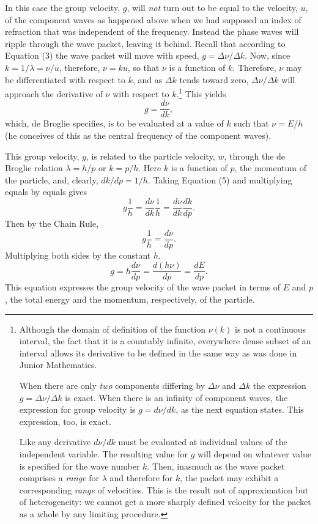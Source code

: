 In this case the group velocity, $g$, will \emph{not} turn out to
be equal to the velocity, $u$, of the component waves as happened
above when we had supposed an index of refraction that was independent
of the frequency. Instead the phase waves will ripple through the wave
packet, leaving it behind. Recall that according to Equation (3) the wave
packet will move with speed, $g = \Delta\nu/\Delta k$. Now, since
$k = 1/\lambda = \nu/u$, therefore,
$\nu = ku$, so that $\nu$ is a function of $k$.
Therefore, $\nu$ may be differentiated with respect to $k$, and
as $\Delta k$ tends toward zero, $\Delta\nu/\Delta k$ will approach the
derivative of $\nu$ with respect to $k$.\footnote{\label{fn:deb_range} Although the
  domain of definition of the function $\nu(k)$ is not a
  continuous interval, the fact that it is a countably infinite,
  everywhere dense subset of an interval allows its derivative to be
  defined in the same way as was done in Junior Mathematics.

  When there are only \emph{two} components differing by $\Delta\nu$ and
  $\Delta k$ the expression $g = \Delta\nu/\Delta k$ is exact. When
  there is an infinity of component waves, the expression for group
  velocity is $g = d\nu/dk$, as the next equation states. This
  expression, too, is exact.

  Like any derivative $d\nu/dk$ must be evaluated at individual
  values of the independent variable. The resulting value for $g$
  will depend on whatever value is specified for the wave number
  $k$. Then, inasmuch as the wave packet comprises a \emph{range}
  for $\lambda$ and therefore for $k$, the packet may exhibit a
  corresponding \emph{range} of velocities. This is the result not of
  approximation but of heterogeneity: we cannot get a more sharply
  defined velocity for the packet as a whole by any limiting procedure.}
This yields
\begin{equation*}\tag{5}\label{debsch}
g = \frac{d\nu}{dk} ,
\end{equation*}
which, de Broglie specifies, is to be evaluated at a value of $k$
such that $\nu = E/h$ (he conceives of this as the
central frequency of the component waves).

This group velocity, $g$, is related to the particle velocity,
$w$, through the de Broglie relation $\lambda = h/p$
or $k = p/h$. Here $k$ is a function of
$p$, the momentum of the particle, and, clearly, $dk/dp=1/h$.
Taking Equation (5) and multiplying equals by equals gives
\begin{equation*}
g\frac{1}{h} = \frac{d\nu}{dk}\frac{1}{h} = \frac{d\nu}{dk}\frac{dk}{dp}.
\end{equation*}
Then by the Chain Rule,
\begin{equation*}
g\frac{1}{h} = \frac{d\nu}{dp}.
\end{equation*}
Multiplying both sides by the constant $h$,
\begin{equation*}
g = h\frac{d\nu}{dp} = \frac{d(h\nu)}{dp} = \frac{dE}{dp}.
\end{equation*}
This equation expresses the group velocity of the wave packet in terms
of $E$ and $p$, the total energy and the momentum,
respectively, of the particle.

